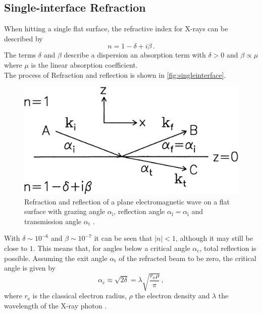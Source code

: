 \subsection{Single-interface Refraction}

When hitting a single flat surface, the refractive index for X-rays can be described by
\begin{equation}
    n = 1 - \delta + i\beta \,.
    \label{eq:refractiveindex}
\end{equation}
The terms $\delta$ and $\beta$ describe a dispersion an absorption term with $\delta > 0$ and $\beta \propto \mu$ where $\mu$ is the linear
absorption coefficient. \\
The process of Refraction and reflection is shown in \autoref{fig:singleinterface}.

\begin{figure}[H]
    \centering
    \includegraphics[width=.9\textwidth]{figures/scattering.png}
    \caption{Refraction and reflection of a plane electromagnetic wave on a flat surface with grazing angle $\alpha_\text{i}$, 
    reflection angle $\alpha_\text{f} = \alpha_\text{i}$ and transmission angle $\alpha_\text{t}$ \cite{tolan}.}
    \label{fig:singleinterface}
\end{figure}

With $\delta \sim 10^{-6}$ and $\beta \sim 10^{-7}$ it can be seen that $|n| < 1$, although it may still be close to $1$.
This means that, for angles below a critical angle $\alpha_\text{c}$, total reflection is possible.
Assuming the exit angle $\alpha_\text{t}$ of the refracted beam to be zero, the critical angle is given by
\begin{equation}
    \alpha_\text{c} \approx \sqrt{2\delta} = \lambda \sqrt{\frac{r_\text{e} \rho}{\pi}} \,,
    \label{eq:critangle}
\end{equation} 
where $r_\text{e}$ is the classical electron radius, $\rho$ the electron density and $\lambda$ the wavelength of the X-ray photon \cite{tolan}. \\

